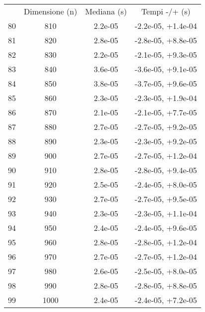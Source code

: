 \begin{table}
\centering
\begin{adjustbox}{width=1\textwidth/2}
\begin{tabular}{|c|c|c|c|}
\hline
 & Dimensione (n) & Mediana (s) & Tempi -/+ (s) \\
80 & 810 & 2.2e-05 & -2.2e-05, +1.4e-04 \\
\cline{1-4}
81 & 820 & 2.8e-05 & -2.8e-05, +8.8e-05 \\
\cline{1-4}
82 & 830 & 2.2e-05 & -2.1e-05, +9.3e-05 \\
\cline{1-4}
83 & 840 & 3.6e-05 & -3.6e-05, +9.1e-05 \\
\cline{1-4}
84 & 850 & 3.8e-05 & -3.7e-05, +9.6e-05 \\
\cline{1-4}
85 & 860 & 2.3e-05 & -2.3e-05, +1.9e-04 \\
\cline{1-4}
86 & 870 & 2.1e-05 & -2.1e-05, +7.7e-05 \\
\cline{1-4}
87 & 880 & 2.7e-05 & -2.7e-05, +9.2e-05 \\
\cline{1-4}
88 & 890 & 2.3e-05 & -2.3e-05, +9.2e-05 \\
\cline{1-4}
89 & 900 & 2.7e-05 & -2.7e-05, +1.2e-04 \\
\cline{1-4}
90 & 910 & 2.8e-05 & -2.8e-05, +9.4e-05 \\
\cline{1-4}
91 & 920 & 2.5e-05 & -2.4e-05, +8.0e-05 \\
\cline{1-4}
92 & 930 & 2.7e-05 & -2.7e-05, +9.5e-05 \\
\cline{1-4}
93 & 940 & 2.3e-05 & -2.3e-05, +1.1e-04 \\
\cline{1-4}
94 & 950 & 2.4e-05 & -2.4e-05, +9.6e-05 \\
\cline{1-4}
95 & 960 & 2.8e-05 & -2.8e-05, +1.2e-04 \\
\cline{1-4}
96 & 970 & 2.7e-05 & -2.7e-05, +1.2e-04 \\
\cline{1-4}
97 & 980 & 2.6e-05 & -2.5e-05, +8.0e-05 \\
\cline{1-4}
98 & 990 & 2.8e-05 & -2.8e-05, +8.8e-05 \\
\cline{1-4}
99 & 1000 & 2.4e-05 & -2.4e-05, +7.2e-05 \\
\cline{1-4}
\end{tabular}
\end{adjustbox}
\end{table}
